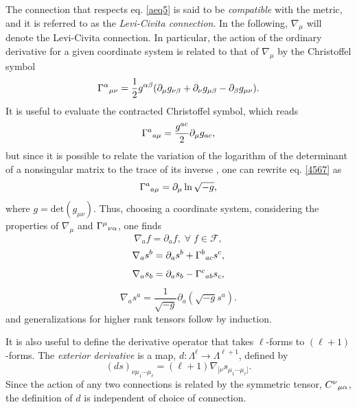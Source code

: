 \documentclass[
12pt,		%
openright,	%
twoside,  %
a4paper,			%
chapter=TITLE,		%
english,			%
french,				%
spanish,			%
brazil				%
]{USPSC-classe/USPSC}
\begin{document}
\begin{apendicesenv}
The connection that respects eq. \ref{aeq5} is said to be \textit{compatible} with the metric, and it is referred to as the \textit{Levi-Civita connection}. In the following, $\nabla_{\mu}$ will denote the Levi-Civita connection. In particular, the action of the ordinary derivative for a given coordinate system is related to that of $\nabla_{\mu}$ by the Christoffel symbol
\begin{equation}
\Gamma^{\alpha}\mathstrut_{\mu\nu}=\frac{1}{2}g^{\alpha\beta}(\partial_{\mu}g_{\nu\beta}+\partial_{\nu}g_{\mu\beta}-\partial_{\beta}g_{\mu\nu}).
\end{equation}
It is useful to evaluate the contracted Christoffel symbol, which reads
\begin{equation}\label{4567}
    \Gamma^{a}\mathstrut_{a\mu}=\frac{g^{ac}}{2}\partial_{\mu} g_{ac},
\end{equation}
but since it is possible to relate the variation of the logarithm of the determinant of a nonsingular matrix to the trace of its inverse \cite{Poisson2004}, one can rewrite eq. \ref{4567} as
\begin{equation}
    \Gamma^{a}\mathstrut_{a\mu}=\partial_{\mu}\ln{\sqrt{-g}},
\end{equation}
where $g=\text{det}(g_{\mu\nu})$. Thus, choosing a coordinate system, considering the properties of $\nabla_{\mu}$ and $\Gamma^{\mu}\mathstrut_{\nu\alpha}$, one finds
\begin{equation}
    \nabla_{a}f=\partial_af, \;\forall\;f\in\mathcal{F},
\end{equation}
\begin{equation}\label{Christoffel vector}
    \nabla_{a}s^{b}=\partial_{a}s^{b}+\Gamma^{b}\mathstrut_{ac}s^{c},
\end{equation}
\begin{equation}\label{Christoffel dual}
    \nabla_{a}s_{b}=\partial_{a}s_{b}-\Gamma^{c}\mathstrut_{ab}s_{c},
\end{equation}
\begin{equation}\label{Christoffel divergence}
    \nabla_{a}s^{a}=\frac{1}{\sqrt{-g}}\partial_a(\sqrt{-g}s^{a}).
\end{equation}
and generalizations for higher rank tensors follow by induction.

It is also useful to define the derivative operator that takes $\ell$-forms to $(\ell+1)$-forms. The \textit{exterior derivative} is a map, $d:\Lambda^{\ell}\to\Lambda^{\ell+1}$, defined by
\begin{equation}
    (ds)_{\nu\mu_1\cdots\mu_{\ell}}=(\ell+1)\nabla_{[\nu}s_{\mu_1\cdots\mu_{\ell}]}.
\end{equation}
Since the action of any two connections is related by the symmetric tensor, $C^{\nu}\mathstrut_{\mu\alpha}$, the definition of $d$ is independent of choice of connection. 


\end{apendicesenv}
\end{document}
